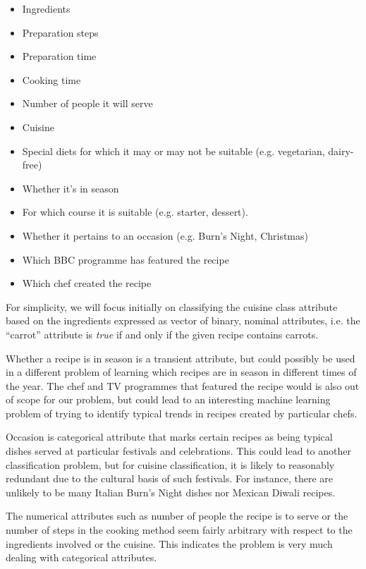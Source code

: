\documentclass[11pt,a4paper]{article}
\begin{document}
\begin{itemize}
  \item Ingredients
  \item Preparation steps
  \item Preparation time
  \item Cooking time
  \item Number of people it will serve
  \item Cuisine
  \item Special diets for which it may or may not be suitable
    (e.g. vegetarian, dairy-free)
  \item Whether it's in season
  \item For which course it is suitable (e.g. starter, dessert).
  \item Whether it pertains to an occasion (e.g. Burn's Night, Christmas)
  \item Which BBC programme has featured the recipe
  \item Which chef created the recipe
\end{itemize}

For simplicity, we will focus initially on classifying the cuisine class
attribute based on the ingredients expressed as vector of binary, nominal
attributes, i.e. the ``carrot'' attribute is \emph{true} if and only if the
given recipe contains carrots.

Whether a recipe is in season is a transient attribute, but could possibly be
used in a different problem of learning which recipes are in season in different
times of the year. The chef and TV programmes that featured the recipe would is
also out of scope for our problem, but could lead to an interesting machine
learning problem of trying to identify typical trends in recipes created by
particular chefs.

Occasion is categorical attribute that marks certain recipes as being typical
dishes served at particular festivals and celebrations. This could lead to
another classification problem, but for cuisine classification, it is likely to
reasonably redundant due to the cultural basis of such festivals. For instance,
there are unlikely to be many Italian Burn's Night dishes nor Mexican Diwali
recipes.

The numerical attributes such as number of people the recipe is to serve or the
number of steps in the cooking method seem fairly arbitrary with respect to the
ingredients involved or the cuisine. This indicates the problem is very much
dealing with categorical attributes.
\end{document}
